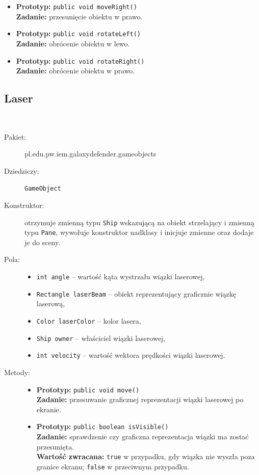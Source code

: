 \documentclass[a4paper]{article}
\newcommand{\prog}{\texttt}
\begin{document}
\begin{description}
\begin{itemize}
        \item \textbf{Prototyp:} \prog{public void moveRight()}\\\textbf{Zadanie:} przesunięcie obiektu w prawo.
        \item \textbf{Prototyp:} \prog{public void rotateLeft()}\\\textbf{Zadanie:} obrócenie obiektu w lewo.
        \item \textbf{Prototyp:} \prog{public void rotateRight()}\\\textbf{Zadanie:} obrócenie obiektu w prawo.
    \end{itemize} 
\end{description}

\subsection{Laser}\
\begin{description}
    \item[Pakiet:] pl.edu.pw.iem.galaxydefender.gameobjects
    \item[Dziedziczy:] \prog{GameObject}
    \item[Konstruktor:] otrzymuje zmienną typu \prog{Ship} wskazującą na obiekt strzelający i zmienną typu \prog{Pane}, wywołuje konstruktor nadklasy i inicjuje zmienne oraz dodaje je do sceny.
    \item[Pola:] \hfill
    \begin{itemize}
        \item \prog{int angle} -- wartość kąta wystrzału wiązki laserowej,
        \item \prog{Rectangle laserBeam} -- obiekt reprezentujący graficznie wiązkę laserową,
        \item \prog{Color laserColor} -- kolor lasera,
        \item \prog{Ship owner} -- właściciel wiązki laserowej,
        \item \prog{int velocity} -- wartość wektora prędkości wiązki laserowej.
    \end{itemize}
    \item[Metody:] \hfill
    \begin{itemize}
        \item \textbf{Prototyp:} \prog{public void move()}\\\textbf{Zadanie:} przesuwanie graficznej reprezentacji wiązki laserowej po ekranie.
        \item \textbf{Prototyp:} \prog{public boolean isVisible()}\\\textbf{Zadanie:} sprawdzenie czy graficzna reprezentacja wiązki ma zostać przesunięta.\\\textbf{Wartość zwracana:} \prog{true} w przypadku, gdy wiązka nie wyszła poza granice ekranu; \prog{false} w przeciwnym przypadku.
    \end{itemize} 
\end{description}
\end{document}

